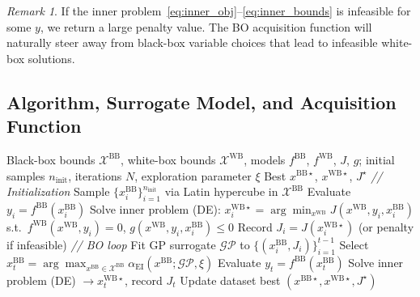 \documentclass[12pt,a4paper]{article}%
\theoremstyle{plain}%
\theoremstyle{remark}%
\newtheorem{remark}{Remark}%
\theoremstyle{definition}%
\def\WB{\mathrm{WB}}
\def\BB{\mathrm{BB}}
\begin{document}
\begin{remark}
If the inner problem~\eqref{eq:inner_obj}--\eqref{eq:inner_bounds} is infeasible for some $y$, we return a large penalty value. The BO acquisition function will naturally steer away from black-box variable choices that lead to infeasible white-box solutions.
\end{remark}

\subsection{Algorithm, Surrogate Model, and Acquisition Function}\label{subsec:algorithm}

\begin{algorithm}[htbp]
\caption{Bilevel Bayesian Optimization}\label{alg:bilevel_bo}
\begin{algorithmic}[1]
\Require Black-box bounds $\mathcal{X}^{\BB}$, white-box bounds $\mathcal{X}^{\WB}$, models $f^{\BB}$, $f^{\WB}$, $J$, $g$; initial samples $n_\text{init}$, iterations $N$, exploration parameter $\xi$
\Ensure Best $x^{\BB\star}$, $x^{\WB\star}$, $J^\star$
\Statex \textit{// Initialization}
\State Sample $\{x^{\BB}_i\}_{i=1}^{n_\text{init}}$ via Latin hypercube in $\mathcal{X}^{\BB}$
    \State Evaluate $y_i = f^{\BB}(x^{\BB}_i)$
    \State Solve inner problem (DE): $x^{\WB\star}_i = \arg\min_{x^{\WB}} J(x^{\WB}, y_i, x^{\BB}_i)$ s.t.\ $f^{\WB}(x^{\WB}, y_i)=0$, $g(x^{\WB}, y_i, x^{\BB}_i) \leq 0$
    \State Record $J_i = J(x^{\WB\star}_i)$ (or penalty if infeasible)
\EndFor
\Statex \textit{// BO loop}
    \State Fit GP surrogate $\mathcal{GP}$ to $\{(x^{\BB}_i, J_i)\}_{i=1}^{t-1}$
    \State Select $x^{\BB}_t = \arg\max_{x^{\BB} \in \mathcal{X}^{\BB}} \alpha_\text{EI}(x^{\BB}; \mathcal{GP}, \xi)$
    \State Evaluate $y_t = f^{\BB}(x^{\BB}_t)$
    \State Solve inner problem (DE) $\to x^{\WB\star}_t$, record $J_t$
    \State Update dataset
\EndFor
\State \Return best $(x^{\BB\star}, x^{\WB\star}, J^\star)$
\end{algorithmic}
\end{algorithm}
\end{document}
